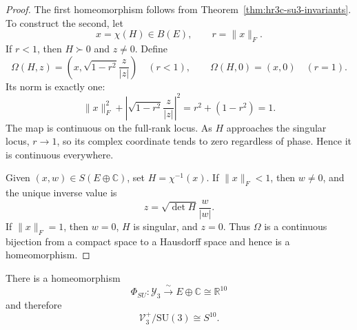\begin{proof}
The first homeomorphism follows from
Theorem~\ref{thm:hr3c-su3-invariants}.  To construct the second, let
\[
 x=\chi(H)\in B(E),
 \qquad
 r=\lVert x\rVert_F.
\]
If \(r<1\), then \(H\succ0\) and \(z\ne0\).  Define
\begin{equation}
 \Omega(H,z)=
 \left(
 x,\sqrt{1-r^2}\frac{z}{|z|}
 \right)
 \quad(r<1),
 \qquad
 \Omega(H,0)=(x,0)
 \quad(r=1).
 \label{eq:hr3c-omega}
\end{equation}
Its norm is exactly one:
\[
 \lVert x\rVert_F^2+
 \left|\sqrt{1-r^2}\frac{z}{|z|}\right|^2
 =r^2+(1-r^2)=1.
\]
The map is continuous on the full-rank locus.  As \(H\) approaches the
singular locus, \(r\to1\), so its complex coordinate tends to zero
regardless of phase.  Hence it is continuous everywhere.

Given \((x,w)\in S(E\oplus\mathbb C)\), set
\(H=\chi^{-1}(x)\).  If \(\lVert x\rVert_F<1\), then \(w\ne0\), and the
unique inverse value is
\begin{equation}
 z=\sqrt{\det H}\frac{w}{|w|}.
 \label{eq:hr3c-omega-inverse-z}
\end{equation}
If \(\lVert x\rVert_F=1\), then \(w=0\), \(H\) is singular, and \(z=0\).
Thus \(\Omega\) is a continuous bijection from a compact space to a
Hausdorff space and hence is a homeomorphism.
\end{proof}

\begin{theorem}
\label{thm:hr3c-su-full-cone}
There is a homeomorphism
\begin{equation}
 \Phi_{SU}:\mathcal Y_3\xrightarrow{\ \sim\ }
 E\oplus\mathbb C\cong\mathbb R^{10}
 \label{eq:hr3c-su-r10}
\end{equation}
and therefore
\begin{equation}
 \mathscr V_3^+/\mathrm{SU}(3)\cong S^{10}.
 \label{eq:hr3c-su-s10}
\end{equation}
\end{theorem}

